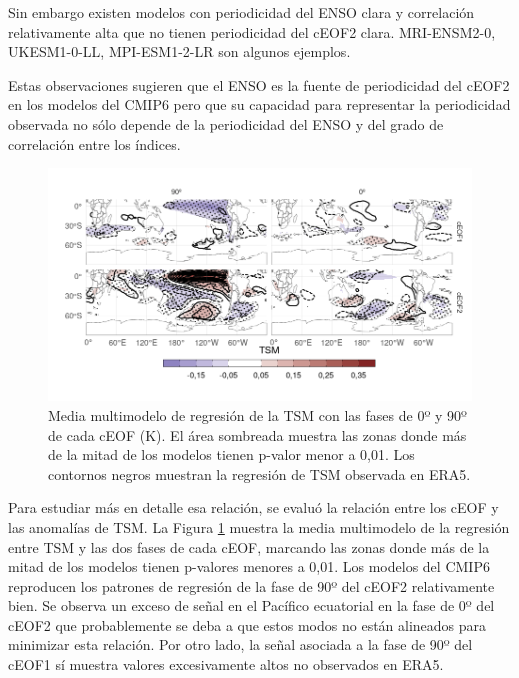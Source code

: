 \documentclass[12pt,oneside,a4paper]{reedthesis}
\begin{document}
Sin embargo existen modelos con periodicidad del ENSO clara y correlación relativamente alta que no tienen periodicidad del cEOF2 clara.
MRI-ENSM2-0, UKESM1-0-LL, MPI-ESM1-2-LR son algunos ejemplos.

Estas observaciones sugieren que el ENSO es la fuente de periodicidad del cEOF2 en los modelos del CMIP6 pero que su capacidad para representar la periodicidad observada no sólo depende de la periodicidad del ENSO y del grado de correlación entre los índices.



\begin{figure}

{\centering \includegraphics{figures/50-cmip6/sst-mmm-1} 

}

\caption{Media multimodelo de regresión de la TSM con las fases de 0º y 90º de cada cEOF (K). El área sombreada muestra las zonas donde más de la mitad de los modelos tienen p-valor menor a 0,01. Los contornos negros muestran la regresión de TSM observada en ERA5.}\label{fig:sst-mmm}
\end{figure}

Para estudiar más en detalle esa relación, se evaluó la relación entre los cEOF y las anomalías de TSM.
La Figura \ref{fig:sst-mmm} muestra la media multimodelo de la regresión entre TSM y las dos fases de cada cEOF, marcando las zonas donde más de la mitad de los modelos tienen p-valores menores a 0,01.
Los modelos del CMIP6 reproducen los patrones de regresión de la fase de 90º del cEOF2 relativamente bien.
Se observa un exceso de señal en el Pacífico ecuatorial en la fase de 0º del cEOF2 que probablemente se deba a que estos modos no están alineados para minimizar esta relación.
Por otro lado, la señal asociada a la fase de 90º del cEOF1 sí muestra valores excesivamente altos no observados en ERA5.
\end{document}
